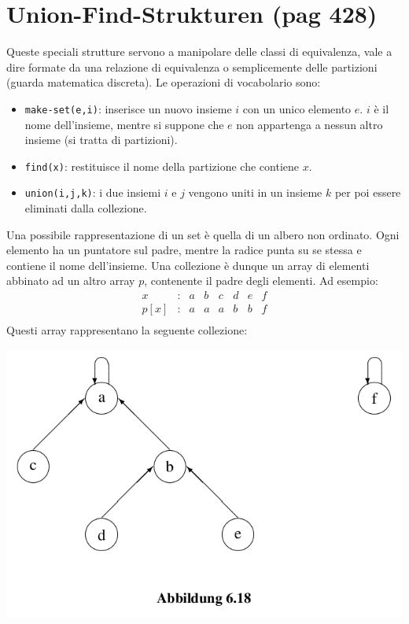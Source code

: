 \documentclass[a4paper]{book}
\newcommand{\inline}[1]{\lstinline!#1!}%
\begin{document}
\section{Union-Find-Strukturen (pag 428)}
Queste speciali strutture servono a manipolare delle classi di equivalenza, vale a dire formate da una relazione di equivalenza o semplicemente delle partizioni (guarda matematica discreta). Le operazioni di vocabolario sono:
\begin{itemize}
\item \inline{make-set(e,i)}: inserisce un nuovo insieme $i$ con un unico elemento $e$. $i$ è il nome dell'insieme, mentre si suppone che $e$ non appartenga a nessun altro insieme (si tratta di partizioni).
\item \inline{find(x)}: restituisce il nome della partizione che contiene $x$.
\item \inline{union(i,j,k)}: i due insiemi $i$ e $j$ vengono uniti in un insieme $k$ per poi essere eliminati dalla collezione.
\end{itemize}
Una possibile rappresentazione di un set è quella di un albero non ordinato. Ogni elemento ha un puntatore sul padre, mentre la radice punta su se stessa e contiene il nome dell'insieme. Una collezione è dunque un array di elementi abbinato ad un altro array $p$, contenente il padre degli elementi. Ad esempio:
\[\begin{array}{*{20}{c}}
{x}&{:}&a&{b}&{c}&d&e&f\\
{p[x]}&{:}&{a}&{a}&{a}&{b}&b&f\\
\end{array}\]
Questi array rappresentano la seguente collezione:
\begin{center}
\includegraphics[scale=0.4]{Figures/ufs.png}
\end{center}
\end{document}
